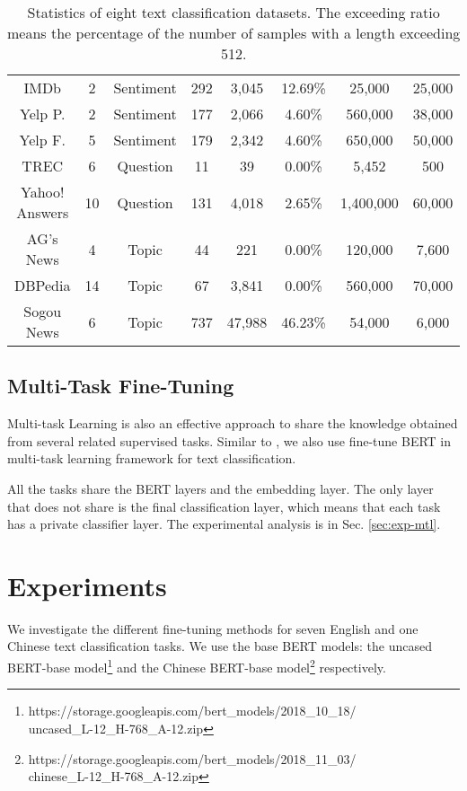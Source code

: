 \documentclass[11pt,a4paper]{article}
\theoremstyle{definition}
\begin{document}
\begin{CJK*}{UTF8}{gbsn}
\begin{table*}[t!]
\begin{tabular}{c c c c c c c c}
    IMDb & 2 & Sentiment & 292 & 3,045 & 12.69\% & 25,000 & 25,000  \\
    Yelp P. & 2 & Sentiment & 177 & 2,066 & 4.60\% & 560,000 & 38,000 \\
    Yelp F. & 5 & Sentiment & 179 & 2,342 & 4.60\% & 650,000 & 50,000 \\
    TREC & 6 & Question & 11 & 39 & 0.00\% & 5,452 & 500 \\
    Yahoo! Answers & 10 & Question & 131 & 4,018 & 2.65\% & 1,400,000 & 60,000 \\
    AG's News & 4 & Topic & 44 & 221 & 0.00\% & 120,000 & 7,600  \\
    DBPedia & 14 & Topic & 67 & 3,841 & 0.00\% & 560,000 & 70,000 \\
    Sogou News & 6 & Topic & 737 & 47,988 & 46.23\% & 54,000 & 6,000  \\
    \bottomrule
\end{tabular}
		\caption{\label{table_1} Statistics of eight text classification datasets. The exceeding ratio means the percentage of the number of samples with a length exceeding 512.
		}
	\end{table*}

\subsection{Multi-Task Fine-Tuning} \label{multi}
	


Multi-task Learning is also an effective approach to share the knowledge obtained from several related supervised tasks. Similar to \citet{liu2019multi}, we also use fine-tune BERT in multi-task learning framework for text classification.

All the tasks share the BERT layers and the embedding layer. The only layer that does not share is the final classification layer, which means that each task has a private classifier layer. The experimental analysis is in Sec. \ref{sec:exp-mtl}.





	\section{Experiments}
    We investigate the different fine-tuning methods for seven English and one Chinese text classification tasks. We use the base BERT models: the uncased BERT-base model\footnote{https://storage.googleapis.com/bert\_models/2018\_10\_18/\\uncased\_L-12\_H-768\_A-12.zip} and the Chinese BERT-base model\footnote{https://storage.googleapis.com/bert\_models/2018\_11\_03/\\chinese\_L-12\_H-768\_A-12.zip} respectively.


\end{CJK*}
\end{document}
